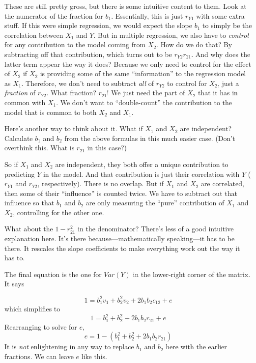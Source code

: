 \documentclass[
]{book}
\begin{document}
These are still pretty gross, but there is some intuitive content to them. Look at the numerator of the fraction for \(b_{1}\). Essentially, this is just \(r_{Y1}\) with some extra stuff. If this were simple regression, we would expect the slope \(b_{1}\) to simply be the correlation between \(X_{1}\) and \(Y\). But in multiple regression, we also have to \emph{control} for any contribution to the model coming from \(X_{2}\). How do we do that? By subtracting off that contribution, which turns out to be \(r_{Y2}r_{21}\). And why does the latter term appear the way it does? Because we only need to control for the effect of \(X_{2}\) if \(X_{2}\) is providing some of the same ``information'' to the regression model as \(X_{1}\). Therefore, we don't need to subtract \emph{all} of \(r_{Y2}\) to control for \(X_{2}\), just a \emph{fraction} of \(r_{Y2}\). What fraction? \(r_{21}\)! We just need the part of \(X_{2}\) that it has in common with \(X_{1}\). We don't want to ``double-count'' the contribution to the model that is common to both \(X_{2}\) and \(X_{1}\).

Here's another way to think about it. What if \(X_{1}\) and \(X_{2}\) are independent? Calculate \(b_{1}\) and \(b_{2}\) from the above formulas in this much easier case. (Don't overthink this. What is \(r_{21}\) in this case?)

So if \(X_{1}\) and \(X_{2}\) are independent, they both offer a unique contribution to predicting \(Y\) in the model. And that contribution is just their correlation with \(Y\) (\(r_{Y1}\) and \(r_{Y2}\), respectively). There is no overlap. But if \(X_{1}\) and \(X_{2}\) are correlated, then some of their ``influence'' is counted twice. We have to subtract out that influence so that \(b_{1}\) and \(b_{2}\) are only measuring the ``pure'' contribution of \(X_{1}\) and \(X_{2}\), controlling for the other one.

What about the \(1 - r_{21}^{2}\) in the denominator? There's less of a good intuitive explanation here. It's there because---mathematically speaking---it has to be there. It rescales the slope coefficients to make everything work out the way it has to.

The final equation is the one for \(Var(Y)\) in the lower-right corner of the matrix. It says

\[
1 = b_{1}^{2} v_{1} + b_{2}^{2} v_{2} + 2b_{1}b_{2} c_{12} + e
\]
which simplifies to
\[
1 = b_{1}^{2} + b_{2}^{2} + 2b_{1}b_{2} r_{21} + e
\]
Rearranging to solve for \(e\),
\[
e = 1 - \left(b_{1}^{2} + b_{2}^{2} + 2b_{1}b_{2} r_{21}\right)
\]
It is \emph{not} enlightening in any way to replace \(b_{1}\) and \(b_{2}\) here with the earlier fractions. We can leave \(e\) like this.
\end{document}
